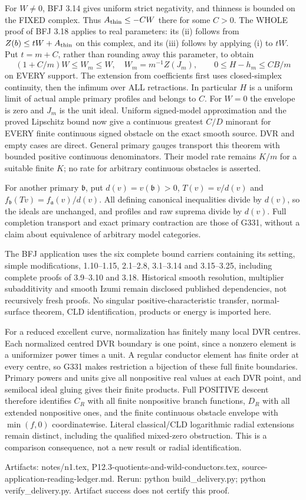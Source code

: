 For $W\ne0$, BFJ 3.14 gives uniform strict negativity, and thinness is
bounded on the FIXED complex. Thus $A_{\rm thin}\le-CW$ there for some
$C>0$. The WHOLE proof of BFJ 3.18 applies to real parameters: its (ii)
follows from $Z(b)\le tW+A_{\rm thin}$ on this complex, and its (iii)
follows by applying (i) to $tW$. Put $t=m+C$, rather than rounding away
this parameter, to obtain
\[
 (1+C/m)W\le W_m\le W,\quad W_m=m^{-1}Z(J_m),
 \qquad 0\le H-h_m\le CB/m
\]
on EVERY support. The extension from coefficients first uses closed-simplex
continuity, then the infimum over ALL retractions. In particular $H$ is a
uniform limit of actual ample primary profiles and belongs to $C$.
For $W=0$ the envelope is zero and $J_m$ is the unit ideal. Uniform
signed-model approximation and the proved Lipschitz bound now give a
continuous greatest $C/D$ minorant for EVERY finite continuous signed
obstacle on the exact smooth source. DVR and empty cases are direct.
General primary gauges transport this theorem with bounded positive
continuous denominators. Their model rate remains $K/m$ for a suitable
finite $K$; no rate for arbitrary continuous obstacles is asserted.

For another primary $\mathfrak b$, put $d(v)=v(\mathfrak b)>0$,
$T(v)=v/d(v)$ and $f_{\mathfrak b}(Tv)=f_{\mathfrak a}(v)/d(v)$.
All defining canonical inequalities divide by $d(v)$, so the ideals are
unchanged, and profiles and raw suprema divide by $d(v)$. Full completion
transport and exact primary contraction are those of G331, without a
claim about equivalence of arbitrary model categories.

The BFJ application uses the six complete bound carriers containing its
setting, simple modifications, 1.10--1.15, 2.1--2.8, 3.1--3.14 and
3.15--3.25, including complete proofs of 3.9--3.10 and 3.18.
Historical smooth resolution, multiplier subadditivity and smooth Izumi
remain disclosed published dependencies, not recursively fresh proofs.
No singular positive-characteristic transfer, normal-surface theorem,
CLD identification, products or energy is imported here.

For a reduced excellent curve, normalization has finitely many local DVR
centres. Each normalized centred DVR boundary is one point, since a
nonzero element is a uniformizer power times a unit. A regular conductor
element has finite order at every centre, so G331 makes restriction a
bijection of these full finite boundaries. Primary powers and units give
all nonpositive real values at each DVR point, and semilocal ideal gluing
gives their finite products. Full POSITIVE descent therefore identifies
$C_R$ with all finite nonpositive branch functions, $D_R$ with all extended
nonpositive ones, and the finite continuous obstacle envelope with
$\min(f,0)$ coordinatewise. Literal classical/CLD logarithmic radial
extensions remain distinct, including the qualified mixed-zero obstruction.
This is a comparison consequence, not a new result or radial identification.

Artifacts: notes/n1.tex, P12.3-quotients-and-wild-conductors.tex,
source-application-reading-ledger.md. Rerun: python build\_delivery.py;
python verify\_delivery.py. Artifact success does not certify this proof.

